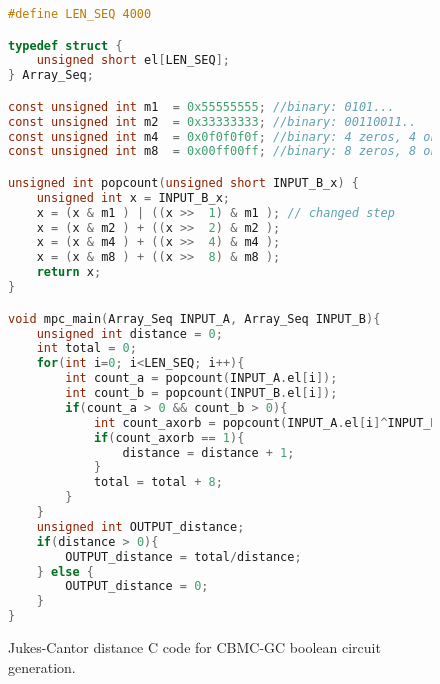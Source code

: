 \begin{figure}
\begin{lstlisting}[language=C]
#define LEN_SEQ 4000

typedef struct {
	unsigned short el[LEN_SEQ];
} Array_Seq;

const unsigned int m1  = 0x55555555; //binary: 0101...
const unsigned int m2  = 0x33333333; //binary: 00110011..
const unsigned int m4  = 0x0f0f0f0f; //binary: 4 zeros, 4 ones ...
const unsigned int m8  = 0x00ff00ff; //binary: 8 zeros, 8 ones ...

unsigned int popcount(unsigned short INPUT_B_x) {
    unsigned int x = INPUT_B_x;
    x = (x & m1 ) | ((x >>  1) & m1 ); // changed step
    x = (x & m2 ) + ((x >>  2) & m2 );
    x = (x & m4 ) + ((x >>  4) & m4 ); 
    x = (x & m8 ) + ((x >>  8) & m8 );
    return x;
}

void mpc_main(Array_Seq INPUT_A, Array_Seq INPUT_B){
	unsigned int distance = 0;
	int total = 0;
	for(int i=0; i<LEN_SEQ; i++){		
		int count_a = popcount(INPUT_A.el[i]);
		int count_b = popcount(INPUT_B.el[i]);
		if(count_a > 0 && count_b > 0){
			int count_axorb = popcount(INPUT_A.el[i]^INPUT_B.el[i]);			
			if(count_axorb == 1){
				distance = distance + 1;
			}
			total = total + 8;
		}
	}
	unsigned int OUTPUT_distance;
	if(distance > 0){
		OUTPUT_distance = total/distance;
	} else {
		OUTPUT_distance = 0;
	}
}
\end{lstlisting}
\caption{Jukes-Cantor distance C code for CBMC-GC boolean circuit generation.}
\label{fig:jc_cbmc-gc}
\end{figure}
 

%
%
%
%
%
%
%